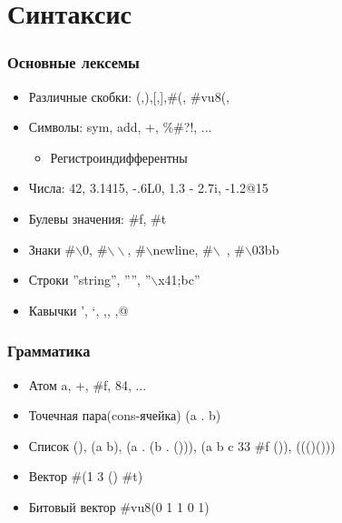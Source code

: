 \documentclass[16pt,pdf,unicode]{beamer}
\begin{document}
\section{Синтаксис}

\begin{frame}
\frametitle{Основные лексемы}
\begin{itemize}
\item Различные скобки: (,),[,],\#(, \#vu8(,
\item Символы: sym, add, +, \%\#?!, ...
  \begin{itemize}
    \item Регистроиндифферентны
  \end{itemize}
\item Числа: 42, 3.1415, -.6L0, 1.3 - 2.7i, -1.2@15
\item Булевы значения: \#f, \#t
\item Знаки \#$\backslash$0, \#$\backslash\backslash$, \#$\backslash$newline, \#$\backslash$\ , \#$\backslash$03bb
\item Строки ''string'',  '''', ''$\backslash$x41;bc''
\item Кавычки ', `, ,, ,@
\end{itemize}
\end{frame}

\begin{frame}
  \frametitle{Грамматика}
  \begin{itemize}
    \item Атом a, +, \#f, 84, ...
    \item Точечная пара(cons-ячейка) (a . b)
    \item Список (), (a b), (a . (b . ())), (a b c 33 \#f ()), ((()()))
    \item Вектор \#(1 3 () \#t)
    \item Битовый вектор \#vu8(0 1 1 0 1)
  \end{itemize}
\end{frame}
\end{document}
